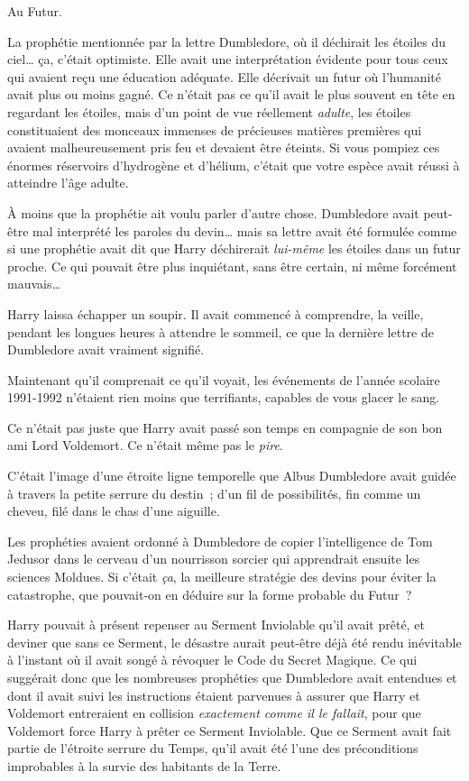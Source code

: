 Au Futur.

La prophétie mentionnée par la lettre Dumbledore, où il déchirait les étoiles du ciel… ça, c'était optimiste. Elle avait une interprétation évidente pour tous ceux qui avaient reçu une éducation adéquate. Elle décrivait un futur où l'humanité avait plus ou moins gagné. Ce n'était pas ce qu'il avait le plus souvent en tête en regardant les étoiles, mais d'un point de vue réellement \emph{adulte}, les étoiles constituaient des monceaux immenses de précieuses matières premières qui avaient malheureusement pris feu et devaient être éteints. Si vous pompiez ces énormes réservoirs d'hydrogène et d'hélium, c'était que votre espèce avait réussi à atteindre l'âge adulte.

À moins que la prophétie ait voulu parler d'autre chose. Dumbledore avait peut-être mal interprété les paroles du devin… mais sa lettre avait été formulée comme si une prophétie avait dit que Harry déchirerait \emph{lui-même} les étoiles dans un futur proche. Ce qui pouvait être plus inquiétant, sans être certain, ni même forcément mauvais…

Harry laissa échapper un soupir. Il avait commencé à comprendre, la veille, pendant les longues heures à attendre le sommeil, ce que la dernière lettre de Dumbledore avait vraiment signifié.

Maintenant qu'il comprenait ce qu'il voyait, les événements de l'année scolaire 1991-1992 n'étaient rien moins que terrifiants, capables de vous glacer le sang.

Ce n'était pas juste que Harry avait passé son temps en compagnie de son bon ami Lord Voldemort. Ce n'était même pas le \emph{pire}.

C'était l'image d'une étroite ligne temporelle que Albus Dumbledore avait guidée à travers la petite serrure du destin~; d'un fil de possibilités, fin comme un cheveu, filé dans le chas d'une aiguille.

Les prophéties avaient ordonné à Dumbledore de copier l'intelligence de Tom Jedusor dans le cerveau d'un nourrisson sorcier qui apprendrait ensuite les sciences Moldues. Si c'était \emph{ça}, la meilleure stratégie des devins pour éviter la catastrophe, que pouvait-on en déduire sur la forme probable du Futur~?

Harry pouvait à présent repenser au Serment Inviolable qu'il avait prêté, et deviner que sans ce Serment, le désastre aurait peut-être déjà été rendu inévitable à l'instant où il avait songé à révoquer le Code du Secret Magique. Ce qui suggérait donc que les nombreuses prophéties que Dumbledore avait entendues et dont il avait suivi les instructions étaient parvenues à assurer que Harry et Voldemort entreraient en collision \emph{exactement comme il le fallait}, pour que Voldemort force Harry à prêter ce Serment Inviolable. Que ce Serment avait fait partie de l'étroite serrure du Temps, qu'il avait été l'une des préconditions improbables à la survie des habitants de la Terre.

